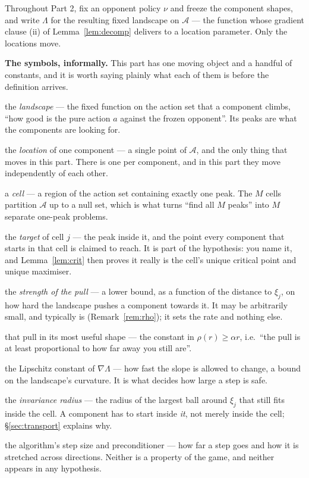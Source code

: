 \documentclass[11pt]{article}
\theoremstyle{definition}
\newcommand{\cA}{\mathcal{A}}
\begin{document}
Throughout Part 2, fix an opponent policy $\nu$ and freeze the component shapes,
and write $\Lambda$ for the resulting fixed landscape on $\cA$ --- the function
whose gradient clause (ii) of Lemma~\ref{lem:decomp} delivers to a location
parameter. Only the locations move.

\medskip\noindent
\textbf{The symbols, informally.} This part has one moving object and a handful of
constants, and it is worth saying plainly what each of them is before the
definition arrives.
\begin{description}[leftmargin=2.6em, itemsep=2pt, font=\normalfont]
\item[$\Lambda$:] the \emph{landscape} --- the fixed function on the action set
  that a component climbs, ``how good is the pure action $a$ against the frozen
  opponent''. Its peaks are what the components are looking for.
\item[$m$:] the \emph{location} of one component --- a single point of $\cA$, and
  the only thing that moves in this part. There is one per component, and in this
  part they move independently of each other.
\item[$\cA_j$:] a \emph{cell} --- a region of the action set containing exactly
  one peak. The $M$ cells partition $\cA$ up to a null set, which is what turns
  ``find all $M$ peaks'' into $M$ separate one-peak problems.
\item[$\xi_j$:] the \emph{target} of cell $j$ --- the peak inside it, and the
  point every component that starts in that cell is claimed to reach. It is part
  of the hypothesis: you name it, and Lemma~\ref{lem:crit} then proves it really
  is the cell's unique critical point and unique maximiser.
\item[$\rho$:] the \emph{strength of the pull} --- a lower bound, as a function of
  the distance to $\xi_j$, on how hard the landscape pushes a component towards
  it. It may be arbitrarily small, and typically is (Remark~\ref{rem:rho}); it
  sets the rate and nothing else.
\item[$\alpha$:] that pull in its most useful shape --- the constant in
  $\rho(r) \ge \alpha r$, i.e.\ ``the pull is at least proportional to how far
  away you still are''.
\item[$L$:] the Lipschitz constant of $\nabla\Lambda$ --- how fast the slope is
  allowed to change, a bound on the landscape's curvature. It is what decides how
  large a step is safe.
\item[$R_j$:] the \emph{invariance radius} --- the radius of the largest ball
  around $\xi_j$ that still fits inside the cell. A component has to start inside
  \emph{it}, not merely inside the cell; \S\ref{sec:transport} explains why.
\item[$\eta$, $P$:] the algorithm's step size and preconditioner --- how far a
  step goes and how it is stretched across directions. Neither is a property of
  the game, and neither appears in any hypothesis.
\end{description}
\end{document}
